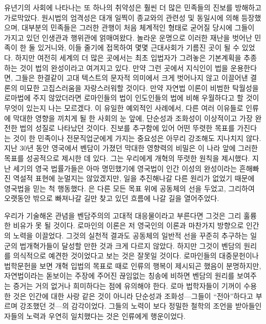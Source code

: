 유년기의 사회에 나타나는 또 하나의 취약성은 훨씬 더 많은 민족들의 진보를
방해하고 가로막았다.
원시법의 엄격성은 대개 일찍이 종교와의 관련성 및 동일시에 의해 등장했으며,
대부분의 민족들은 그러한 관행이 처음 체계적인 형태로 굳어질 당시에 그들이
가지고 있던 인생관과 행위관에 얽매여왔다.
놀라운 운명으로 이러한 재난을 벗어난 민족이 한 둘 있거니와,
이들 줄기에 접목하여 몇몇 근대사회가 기름진 곳이 될 수 있었다.
하지만 여전히 세계의 더 많은 곳에서는 최초 입법자가 그려놓은 기본계획을
추종하는 것이 법의 완성이라고 여겨지고 있다.
만약 그런 곳에서 지식인이 법을 운용한다면, 그들은 한결같이
고대 텍스트의 문자적 의미에서 크게 벗어나지 않고 이끌어낸 결론의
미묘한 고집스러움을 자랑스러워할 것이다.
만약 자연법 이론이 비범한 탁월성을 로마법에 주지 않았더라면
로마인들의 법이 인도인들의 법에 비해 우월하다고 할 것이
무엇이 있는지 나는 모르겠다.
이 유일한 예외적인 사례에서, 다른 여러 이유들로 인류에 막대한 영향을 끼치게 될
한 사회의 눈 앞에, 단순성과 조화성이 이상적이고 가장 완전한 법의 성질로
나타났던 것이다.
진보를 추구함에 있어 어떤 뚜렷한 목표를 가진다는 것이
한 민족이나 전문직업군에게 가지는 중요성은 아무리 강조해도 지나치지 않다.
지난 30년 동안 영국에서 벤담이 가졌던 막대한 영향력의 비밀은
이 나라 앞에 그러한 목표를 성공적으로 제시한 데 있다.
그는 우리에게 개혁의 뚜렷한 원칙을 제시했다.
지난 세기의 영국 법률가들은 아마 명민했기에
영국법이 인간 이성의 완성이라는 흔해빠진 역설적 표현에 눈멀지는 않았겠지만,
일을 추진해나갈 다른 원리가 없었기 때문에 영국법을 믿는 척 행동했다.
은 다른 모든 목표 위에 공동체의 선을 두었고,
그리하여 오랫동안 밖으로 빠져나갈 길만 찾고 있던 흐름에 나갈 길을 열어주었다.

우리가 기술해온 관념을 벤담주의의 고대적 대응물이라고 부른다면
그것은 그리 훌륭한 비유가 못 될 것이다.
로마인의 이론은 저 영국인의 이론과 마찬가지 방향으로 인간의 노력을 이끌었다.
그것의 실천적 결과도 공동체의 일반적 선을 꾸준히 추구하는
일군의 법개혁가들이 달성할 만한 것과 크게 다르지 않았다.
하지만 그것이 벤담의 원리를
의식적으로 예견한 것이었다고 보는 것은 잘못일 것이다.
로마인들의 대중문헌이나 법학문헌을 보면
개혁 입법의 목표로
때로 인류의 행복이 제시되곤 했음이 분명하지만,
자연법이라는 돋보이는 주장에 주어진 끊임없는 칭송에 비하면
벤담의 원리를 보여주는 증거는 거의 없거나 희미하다는 점에
유의해야 한다.
로마 법학자들이 기꺼이 수용한 것은 인간에 대한 사랑 같은 것이 아니라
단순성과 조화성---그들이 ``전아''하다고 부르며
강조했던 것---의 감각이었다.
그들의 노력이 보다 정밀한 철학의 조언을 받아들인 자들의 노력과
우연히 일치했다는 것은 인류에게 행운이었다.

